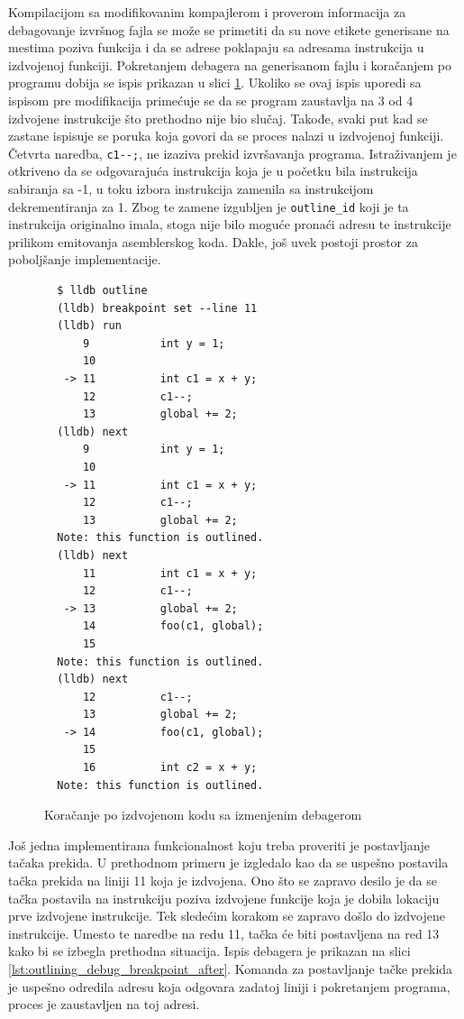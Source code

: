 \documentclass[12pt,oneside]{memoir}
\begin{document}
Kompilacijom sa modifikovanim kompajlerom i proverom informacija za debagovanje izvršnog fajla se može se primetiti da su nove etikete generisane na mestima poziva funkcija i da se adrese poklapaju sa adresama instrukcija u izdvojenoj funkciji.
Pokretanjem debagera na generisanom fajlu i koračanjem po programu dobija se ispis prikazan u slici \ref{lst:outlining_debug_step_after}.
Ukoliko se ovaj ispis uporedi sa ispisom pre modifikacija primećuje se da se program zaustavlja na 3 od 4 izdvojene instrukcije što prethodno nije bio slučaj.
Takođe, svaki put kad se zastane ispisuje se poruka koja govori da se proces nalazi u izdvojenoj funkciji.
Četvrta naredba, \verb|c1--;|, ne izaziva prekid izvršavanja programa.
Istraživanjem je otkriveno da se odgovarajuća instrukcija koja je u početku bila instrukcija sabiranja sa -1, u toku izbora instrukcija zamenila sa instrukcijom dekrementiranja za 1.
Zbog te zamene izgubljen je \verb|outline_id| koji je ta instrukcija originalno imala, stoga nije bilo moguće pronaći adresu te instrukcije prilikom emitovanja asemblerskog koda.
% 
Dakle, još uvek postoji prostor za poboljšanje implementacije.

\begin{figure}[!ht]
\begin{verbatim}
  $ lldb outline
  (lldb) breakpoint set --line 11
  (lldb) run
      9           int y = 1;
      10          
   -> 11          int c1 = x + y;
      12          c1--;
      13          global += 2;
  (lldb) next
      9           int y = 1;
      10          
   -> 11          int c1 = x + y;
      12          c1--;
      13          global += 2;
  Note: this function is outlined.
  (lldb) next
      11          int c1 = x + y;
      12          c1--;
   -> 13          global += 2;
      14          foo(c1, global);
      15          
  Note: this function is outlined.
  (lldb) next
      12          c1--;
      13          global += 2;
   -> 14          foo(c1, global);
      15          
      16          int c2 = x + y;
  Note: this function is outlined.
\end{verbatim}
\caption{Koračanje po izdvojenom kodu sa izmenjenim debagerom}
\label{lst:outlining_debug_step_after}
\end{figure}

Još jedna implementirana funkcionalnost koju treba proveriti je postavljanje tačaka prekida.
U prethodnom primeru je izgledalo kao da se uspešno postavila tačka prekida na liniji 11 koja je izdvojena.
Ono što se zapravo desilo je da se tačka postavila na instrukciju poziva izdvojene funkcije koja je dobila lokaciju prve izdvojene instrukcije.
Tek sledećim korakom se zapravo došlo do izdvojene instrukcije.
Umesto te naredbe na redu 11, tačka će biti postavljena na red 13 kako bi se izbegla prethodna situacija.
Ispis debagera je prikazan na slici \ref{lst:outlining_debug_breakpoint_after}.
Komanda za postavljanje tačke prekida je uspešno odredila adresu koja odgovara zadatoj liniji i pokretanjem programa, proces je zaustavljen na toj adresi.
\end{document}
